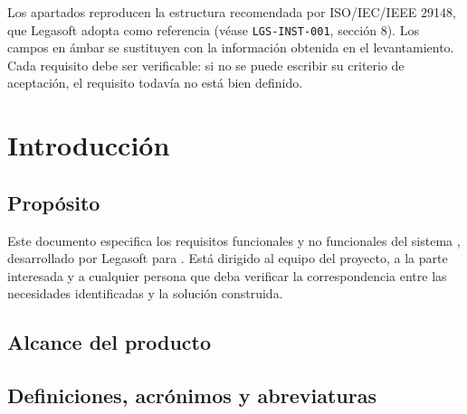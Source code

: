 \documentclass[11pt,a4paper]{article}
\begin{document}
\lgportada


\begin{porcompletar}
Los apartados reproducen la estructura recomendada por ISO/IEC/IEEE 29148, que
Legasoft adopta como referencia (véase \texttt{LGS-INST-001}, sección 8). Los
campos en ámbar se sustituyen con la información obtenida en el levantamiento.
Cada requisito debe ser verificable: si no se puede escribir su criterio de
aceptación, el requisito todavía no está bien definido.
\end{porcompletar}

\tableofcontents
\clearpage

\section{Introducción}

\subsection{Propósito}

Este documento especifica los requisitos funcionales y no funcionales del sistema
, desarrollado por Legasoft para . Está dirigido al equipo del proyecto, a la parte interesada y a
cualquier persona que deba verificar la correspondencia entre las necesidades
identificadas y la solución construida.

\subsection{Alcance del producto}

\begin{porcompletar}
\end{porcompletar}

\subsection{Definiciones, acrónimos y abreviaturas}
\end{document}

